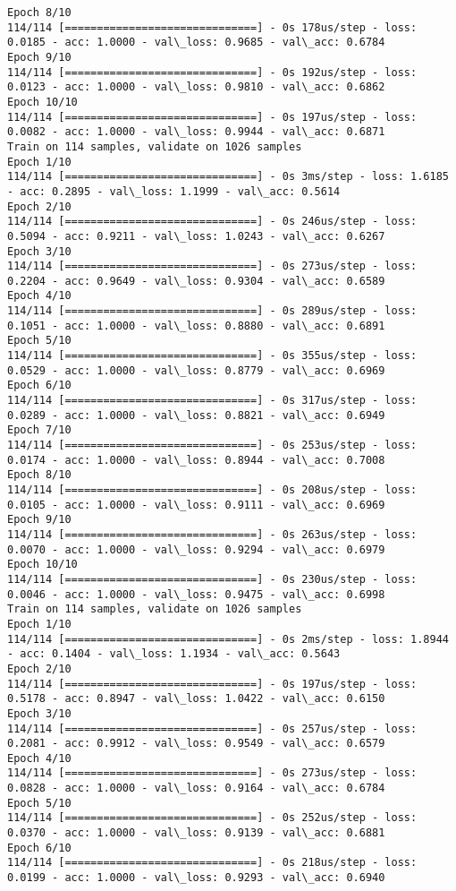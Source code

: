\documentclass[11pt]{article}
\begin{document}
\begin{Verbatim}[commandchars=\\\{\}]
Epoch 8/10
114/114 [==============================] - 0s 178us/step - loss: 0.0185 - acc: 1.0000 - val\_loss: 0.9685 - val\_acc: 0.6784
Epoch 9/10
114/114 [==============================] - 0s 192us/step - loss: 0.0123 - acc: 1.0000 - val\_loss: 0.9810 - val\_acc: 0.6862
Epoch 10/10
114/114 [==============================] - 0s 197us/step - loss: 0.0082 - acc: 1.0000 - val\_loss: 0.9944 - val\_acc: 0.6871
Train on 114 samples, validate on 1026 samples
Epoch 1/10
114/114 [==============================] - 0s 3ms/step - loss: 1.6185 - acc: 0.2895 - val\_loss: 1.1999 - val\_acc: 0.5614
Epoch 2/10
114/114 [==============================] - 0s 246us/step - loss: 0.5094 - acc: 0.9211 - val\_loss: 1.0243 - val\_acc: 0.6267
Epoch 3/10
114/114 [==============================] - 0s 273us/step - loss: 0.2204 - acc: 0.9649 - val\_loss: 0.9304 - val\_acc: 0.6589
Epoch 4/10
114/114 [==============================] - 0s 289us/step - loss: 0.1051 - acc: 1.0000 - val\_loss: 0.8880 - val\_acc: 0.6891
Epoch 5/10
114/114 [==============================] - 0s 355us/step - loss: 0.0529 - acc: 1.0000 - val\_loss: 0.8779 - val\_acc: 0.6969
Epoch 6/10
114/114 [==============================] - 0s 317us/step - loss: 0.0289 - acc: 1.0000 - val\_loss: 0.8821 - val\_acc: 0.6949
Epoch 7/10
114/114 [==============================] - 0s 253us/step - loss: 0.0174 - acc: 1.0000 - val\_loss: 0.8944 - val\_acc: 0.7008
Epoch 8/10
114/114 [==============================] - 0s 208us/step - loss: 0.0105 - acc: 1.0000 - val\_loss: 0.9111 - val\_acc: 0.6969
Epoch 9/10
114/114 [==============================] - 0s 263us/step - loss: 0.0070 - acc: 1.0000 - val\_loss: 0.9294 - val\_acc: 0.6979
Epoch 10/10
114/114 [==============================] - 0s 230us/step - loss: 0.0046 - acc: 1.0000 - val\_loss: 0.9475 - val\_acc: 0.6998
Train on 114 samples, validate on 1026 samples
Epoch 1/10
114/114 [==============================] - 0s 2ms/step - loss: 1.8944 - acc: 0.1404 - val\_loss: 1.1934 - val\_acc: 0.5643
Epoch 2/10
114/114 [==============================] - 0s 197us/step - loss: 0.5178 - acc: 0.8947 - val\_loss: 1.0422 - val\_acc: 0.6150
Epoch 3/10
114/114 [==============================] - 0s 257us/step - loss: 0.2081 - acc: 0.9912 - val\_loss: 0.9549 - val\_acc: 0.6579
Epoch 4/10
114/114 [==============================] - 0s 273us/step - loss: 0.0828 - acc: 1.0000 - val\_loss: 0.9164 - val\_acc: 0.6784
Epoch 5/10
114/114 [==============================] - 0s 252us/step - loss: 0.0370 - acc: 1.0000 - val\_loss: 0.9139 - val\_acc: 0.6881
Epoch 6/10
114/114 [==============================] - 0s 218us/step - loss: 0.0199 - acc: 1.0000 - val\_loss: 0.9293 - val\_acc: 0.6940

\end{Verbatim}
\end{document}
